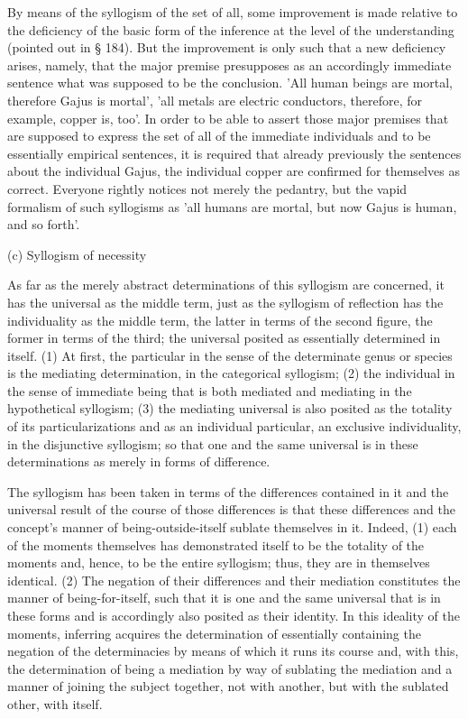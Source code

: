 By means of the syllogism of the set of all,
some improvement is made relative to
the deficiency of the basic form of
the inference at the level of the understanding
(pointed out in § 184).
But the improvement is only such
that a new deficiency arises, namely,
that the major premise presupposes
as an accordingly immediate sentence
what was supposed to be the conclusion.
'All human beings are mortal,
therefore Gajus is mortal',
'all metals are electric conductors,
therefore, for example, copper is, too'.
In order to be able to assert those major premises
that are supposed to express the set of all
of the immediate individuals
and to be essentially empirical sentences,
it is required that already previously
the sentences about the individual Gajus,
the individual copper are confirmed for themselves as correct.
Everyone rightly notices not merely the pedantry,
but the vapid formalism of such syllogisms as
'all humans are mortal, but now Gajus is human, and so forth'.

(c) Syllogism of necessity

As far as the merely abstract determinations of
this syllogism are concerned,
it has the universal as the middle term,
just as the syllogism of reflection
has the individuality as the middle term,
the latter in terms of the second figure,
the former in terms of the third;
the universal posited as essentially determined in itself.
(1) At first, the particular in the sense of
the determinate genus or species is
the mediating determination, in the categorical syllogism;
(2) the individual in the sense of immediate being
that is both mediated and mediating in the hypothetical syllogism;
(3) the mediating universal is also posited
as the totality of its particularizations
and as an individual particular,
an exclusive individuality, in the disjunctive syllogism;
so that one and the same universal is in these determinations
as merely in forms of difference.

The syllogism has been taken in terms of
the differences contained in it
and the universal result of
the course of those differences is
that these differences
and the concept's manner of being-outside-itself
sublate themselves in it.
Indeed, (1) each of the moments themselves
has demonstrated itself to be the totality of the moments
and, hence, to be the entire syllogism;
thus, they are in themselves identical.
(2) The negation of their differences and their mediation
constitutes the manner of being-for-itself,
such that it is one and the same universal that is in these forms
and is accordingly also posited as their identity.
In this ideality of the moments,
inferring acquires the determination of essentially
containing the negation of the determinacies
by means of which it runs its course
and, with this, the determination of being a mediation
by way of sublating the mediation
and a manner of joining the subject together,
not with another, but with the sublated other, with itself.

